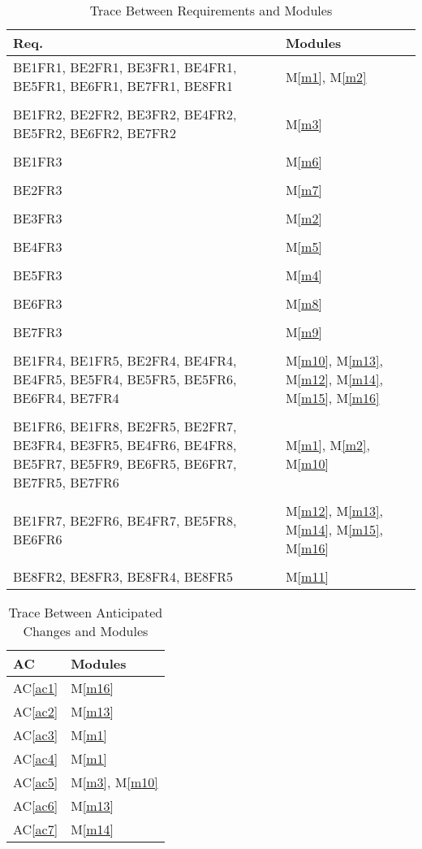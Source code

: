 \documentclass[12pt, titlepage]{article}
\newcommand{\acref}[1]{AC\ref{#1}}
\newcommand{\mref}[1]{M\ref{#1}}
\begin{document}
\begin{table}[H]
\centering
\begin{tabular}{p{} p{}}
\toprule
\textbf{Req.} & \textbf{Modules}\\
\midrule
BE1FR1, BE2FR1, BE3FR1, BE4FR1, BE5FR1, BE6FR1, BE7FR1, BE8FR1 & \mref{m1}, \mref{m2}\\\\
BE1FR2, BE2FR2, BE3FR2, BE4FR2, BE5FR2, BE6FR2, BE7FR2 & \mref{m3}\\\\
BE1FR3 & \mref{m6}\\\\
BE2FR3 & \mref{m7}\\\\
BE3FR3 & \mref{m2}\\\\
BE4FR3 & \mref{m5}\\\\
BE5FR3 & \mref{m4}\\\\
BE6FR3 & \mref{m8}\\\\
BE7FR3 & \mref{m9}\\\\
BE1FR4, BE1FR5, BE2FR4, BE4FR4, BE4FR5, BE5FR4, BE5FR5, BE5FR6, BE6FR4, BE7FR4 & \mref{m10}, \mref{m13}, \mref{m12}, \mref{m14}, \mref{m15}, \mref{m16}\\\\
BE1FR6, BE1FR8, BE2FR5, BE2FR7, BE3FR4, BE3FR5, BE4FR6, BE4FR8, BE5FR7, BE5FR9, BE6FR5, BE6FR7, BE7FR5, BE7FR6 & \mref{m1}, \mref{m2}, \mref{m10}\\\\
BE1FR7, BE2FR6, BE4FR7, BE5FR8, BE6FR6 & \mref{m12}, \mref{m13}, \mref{m14}, \mref{m15}, \mref{m16}\\\\
BE8FR2, BE8FR3, BE8FR4, BE8FR5 & \mref{m11}\\
\bottomrule
\end{tabular}
\caption{Trace Between Requirements and Modules}
\label{TblRT}
\end{table}

\begin{table}[H]
\centering
\begin{tabular}{p{} p{}}
\toprule
\textbf{AC} & \textbf{Modules}\\
\midrule
\acref{ac1} & \mref{m16}\\
\acref{ac2} & \mref{m13}\\
\acref{ac3} & \mref{m1}\\
\acref{ac4} & \mref{m1}\\
\acref{ac5} & \mref{m3}, \mref{m10}\\
\acref{ac6} & \mref{m13}\\
\acref{ac7} & \mref{m14}\\
\bottomrule
\end{tabular}
\caption{Trace Between Anticipated Changes and Modules}
\label{TblACT}
\end{table}
\end{document}
